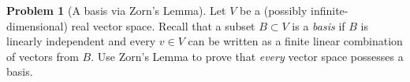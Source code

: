 \documentclass[12pt]{article}
\theoremstyle{definition} %
\newtheorem{problem}{Problem}
\theoremstyle{plain} %
\begin{document}
\begin{problem}[A basis via Zorn’s Lemma]
  Let $V$ be a (possibly infinite-dimensional) real vector space.
  Recall that a subset $B\subset V$ is a \emph{basis} if
  $B$ is linearly independent and
  every $v\in V$ can be written as a finite linear combination of
  vectors from $B$.
  Use Zorn’s Lemma to prove that \emph{every} vector space possesses a
  basis.
\end{problem}
\end{document}
